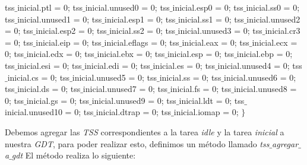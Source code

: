 \begin{algorithmic}
  \State \tab \tab tss$\_$inicial.ptl = 0;
  \State \tab \tab tss$\_$inicial.unused0 = 0;
  \State \tab \tab tss$\_$inicial.esp0 = 0;
  \State \tab \tab tss$\_$inicial.ss0 = 0;
  \State \tab \tab tss$\_$inicial.unused1 = 0;
  \State \tab \tab tss$\_$inicial.esp1 = 0;
  \State \tab \tab tss$\_$inicial.ss1 = 0;
  \State \tab \tab tss$\_$inicial.unused2 = 0;
  \State \tab \tab tss$\_$inicial.esp2 = 0;
  \State \tab \tab tss$\_$inicial.ss2 = 0;
  \State \tab \tab tss$\_$inicial.unused3 = 0;
  \State \tab \tab tss$\_$inicial.cr3 = 0;
  \State \tab \tab tss$\_$inicial.eip = 0;
  \State \tab \tab tss$\_$inicial.eflags = 0;
  \State \tab \tab tss$\_$inicial.eax = 0;
  \State \tab \tab tss$\_$inicial.ecx = 0;
  \State \tab \tab tss$\_$inicial.edx = 0;
  \State \tab \tab tss$\_$inicial.ebx = 0;
  \State \tab \tab tss$\_$inicial.esp = 0;
  \State \tab \tab tss$\_$inicial.ebp = 0;
  \State \tab \tab tss$\_$inicial.esi = 0;
  \State \tab \tab tss$\_$inicial.edi = 0;
  \State \tab \tab tss$\_$inicial.es = 0;
  \State \tab \tab tss$\_$inicial.unused4 = 0;
  \State \tab \tab tss$\_$inicial.cs = 0;
  \State \tab \tab tss$\_$inicial.unused5 = 0;
  \State \tab \tab tss$\_$inicial.ss = 0;
  \State \tab \tab tss$\_$inicial.unused6 = 0;
  \State \tab \tab tss$\_$inicial.ds = 0;
  \State \tab \tab tss$\_$inicial.unused7 = 0;
  \State \tab \tab tss$\_$inicial.fs = 0;
  \State \tab \tab tss$\_$inicial.unused8 = 0;
  \State \tab \tab tss$\_$inicial.gs = 0;
  \State \tab \tab tss$\_$inicial.unused9 = 0;
  \State \tab \tab tss$\_$inicial.ldt = 0;
  \State \tab \tab tss$\_$inicial.unused10 = 0;
  \State \tab \tab tss$\_$inicial.dtrap = 0;
  \State \tab \tab tss$\_$inicial.iomap = 0;
\State \tab $\}$
\end{algorithmic}


Debemos agregar las \textit{TSS} correspondientes a la tarea \textit{idle} y la tarea \textit{inicial} a nuestra \textit{GDT}, para poder realizar esto, definimos un m\'etodo llamado \textit{tss$\_$agregar$\_$a$\_$gdt}
El m\'etodo realiza lo siguiente:

